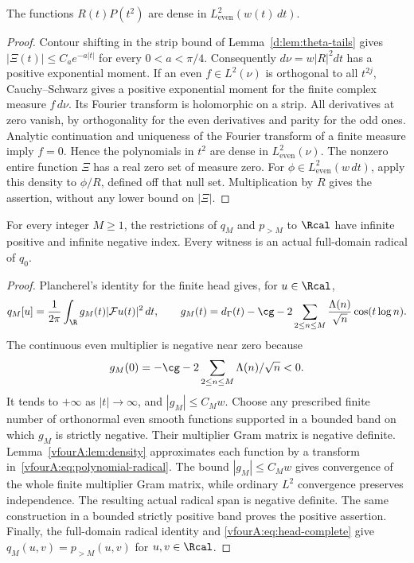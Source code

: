 \begin{lemma}\label{vfourA:lem:density}
The functions $R(t)P(t^2)$ are dense in $L^2_{\mathrm{even}}(w(t)\,dt)$.
\end{lemma}
\begin{proof}
Contour shifting in the strip bound of
Lemma~\ref{d:lem:theta-tails} gives
$|\Xi(t)|\le C_a e^{-a|t|}$ for every $0<a<\pi/4$.  Consequently
$d\nu=w|R|^2dt$ has a positive exponential moment.  If an even
$f\in L^2(\nu)$ is orthogonal to all $t^{2j}$, Cauchy--Schwarz gives
a positive exponential moment for the finite complex measure
$f\,d\nu$.  Its Fourier transform is holomorphic on a strip.  All
derivatives at zero vanish, by orthogonality for the even derivatives
and parity for the odd ones.  Analytic continuation and uniqueness of
the Fourier transform of a finite measure imply $f=0$.  Hence the
polynomials in $t^2$ are dense in $L^2_{\mathrm{even}}(\nu)$.
The nonzero entire function $\Xi$ has a real zero set of measure zero.
For $\phi\in L^2_{\mathrm{even}}(w\,dt)$, apply this density to
$\phi/R$, defined off that null set.  Multiplication by $R$ gives
the assertion, without any lower bound on $|\Xi|$.
\end{proof}

\begin{theorem}
\label{vfourA:thm:indices}
For every integer $M\ge1$, the restrictions of $q_M$ and $p_{>M}$ to
$\Rcal$ have infinite positive and infinite negative index.  Every
witness is an actual full-domain radical of $q_0$.
\end{theorem}
\begin{proof}
Plancherel's identity for the finite head gives, for $u\in\Rcal$,
\begin{equation}\label{vfourA:eq:head-multiplier}
 q_M[u]=\frac1{2\pi}\int_\R g_M(t)|\mathcal Fu(t)|^2\,dt,
 \qquad
 g_M(t)=d_\Gamma(t)-\cg
        -2\sum_{2\le n\le M}\frac{\Lambda(n)}{\sqrt n}\cos(t\log n).
\end{equation}
The continuous even multiplier is negative near zero because
\[
 g_M(0)=-\cg-2\sum_{2\le n\le M}\Lambda(n)/\sqrt n<0.
\]
It tends to $+\infty$ as $|t|\to\infty$, and $|g_M|\le C_Mw$.
Choose any prescribed finite number of orthonormal even smooth
functions supported in a bounded band on which $g_M$ is strictly
negative.  Their multiplier Gram matrix is negative definite.
Lemma~\ref{vfourA:lem:density} approximates each function by a transform
in~\eqref{vfourA:eq:polynomial-radical}.  The bound $|g_M|\le C_Mw$
gives convergence of the whole finite multiplier Gram matrix, while
ordinary $L^2$ convergence preserves independence.  The resulting
actual radical span is negative definite.  The same construction in
a bounded strictly positive band proves the positive assertion.
Finally, the full-domain radical identity and
\eqref{vfourA:eq:head-complete} give
$q_M(u,v)=p_{>M}(u,v)$ for $u,v\in\Rcal$.
\end{proof}

